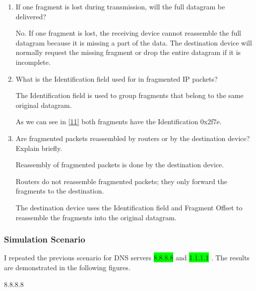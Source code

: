 \documentclass[a4paper]{article}
\begin{document}
\begin{enumerate}
			The MF flag is used to indicate if the fragment is the last one. If MF = 1, it means there are more fragments to come. If MF = 0, it signifies that this is the last fragment in the packet.
			
			The fragment offset tells the receiving system where the current fragment belongs in the reassembly of the original datagram. It is measured in bytes, so an offset of 1480 means the fragment starts 1480 bytes into the original message.
			
			\item If one fragment is lost during transmission, will the full datagram be delivered?
			
			No.
			If one fragment is lost, the receiving device cannot reassemble the full datagram because it is missing a part of the data. The destination device will normally request the missing fragment or drop the entire datagram if it is incomplete.
			
			\item What is the Identification field used for in fragmented IP packets?
			
			The Identification field is used to group fragments that belong to the same original datagram.
			
			As we can see in \ref{11} both fragments have the Identification 0x2f7e.
			
			\item Are fragmented packets reassembled by routers or by the destination device? Explain briefly.
			
			Reassembly of fragmented packets is done by the destination device.
			
			Routers do not reassemble fragmented packets; they only forward the fragments to the destination.
			
			The destination device uses the Identification field and Fragment Offset to reassemble the fragments into the original datagram.
			
		\end{enumerate}
		
		\subsubsection{Simulation Scenario}
		
		I repeated the previous scenario for DNS servers \colorbox{lime}{8.8.8.8} and \colorbox{lime}{1.1.1.1} . The results are demonstrated in the following figures.
		
		
		\begin{center}
			\Large
			8.8.8.8
		\end{center}
		
\end{document}
